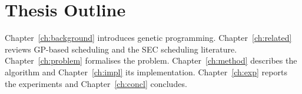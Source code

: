 \section{Thesis Outline}
Chapter~\ref{ch:background} introduces genetic programming.
Chapter~\ref{ch:related} reviews GP-based scheduling and the SEC scheduling
literature. Chapter~\ref{ch:problem} formalises the problem.
Chapter~\ref{ch:method} describes the algorithm and Chapter~\ref{ch:impl} its
implementation. Chapter~\ref{ch:exp} reports the experiments and
Chapter~\ref{ch:concl} concludes.
